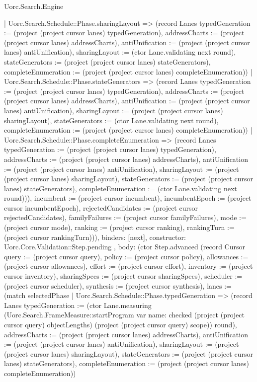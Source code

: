 \begin{lexlean}{Uorc.Search.Engine}
\begin{semanticmodule}
{{{{            | Uorc.Search.Schedule::Phase.sharingLayout => (record Lanes {typedGeneration := (project (project cursor lanes) typedGeneration), addressCharts := (project (project cursor lanes) addressCharts), antiUnification := (project (project cursor lanes) antiUnification), sharingLayout := (ctor Lane.validating next round), stateGenerators := (project (project cursor lanes) stateGenerators), completeEnumeration := (project (project cursor lanes) completeEnumeration)})
            | Uorc.Search.Schedule::Phase.stateGenerators => (record Lanes {typedGeneration := (project (project cursor lanes) typedGeneration), addressCharts := (project (project cursor lanes) addressCharts), antiUnification := (project (project cursor lanes) antiUnification), sharingLayout := (project (project cursor lanes) sharingLayout), stateGenerators := (ctor Lane.validating next round), completeEnumeration := (project (project cursor lanes) completeEnumeration)})
            | Uorc.Search.Schedule::Phase.completeEnumeration => (record Lanes {typedGeneration := (project (project cursor lanes) typedGeneration), addressCharts := (project (project cursor lanes) addressCharts), antiUnification := (project (project cursor lanes) antiUnification), sharingLayout := (project (project cursor lanes) sharingLayout), stateGenerators := (project (project cursor lanes) stateGenerators), completeEnumeration := (ctor Lane.validating next round)})), incumbent := (project cursor incumbent), incumbentEpoch := (project cursor incumbentEpoch), rejectedCandidates := (project cursor rejectedCandidates), familyFailures := (project cursor familyFailures), mode := (project cursor mode), ranking := (project cursor ranking), rankingTurn := (project cursor rankingTurn)})),
          binders: [next],
          constructor: Uorc.Core.Validation::Step.pending
        },
        {
          body: (ctor Step.advanced (record Cursor {query := (project cursor query), policy := (project cursor policy), allowances := (project cursor allowances), effort := (project cursor effort), inventory := (project cursor inventory), sharingSpecs := (project cursor sharingSpecs), scheduler := (project cursor scheduler), synthesis := (project cursor synthesis), lanes := (match selectedPhase
            | Uorc.Search.Schedule::Phase.typedGeneration => (record Lanes {typedGeneration := (ctor Lane.measuring (Uorc.Search.FrameMeasure::startProgram var{
              name: checked
            } (project (project cursor query) objectLengths) (project (project cursor query) scope)) round), addressCharts := (project (project cursor lanes) addressCharts), antiUnification := (project (project cursor lanes) antiUnification), sharingLayout := (project (project cursor lanes) sharingLayout), stateGenerators := (project (project cursor lanes) stateGenerators), completeEnumeration := (project (project cursor lanes) completeEnumeration)})
}}}}
\end{semanticmodule}
\end{lexlean}

